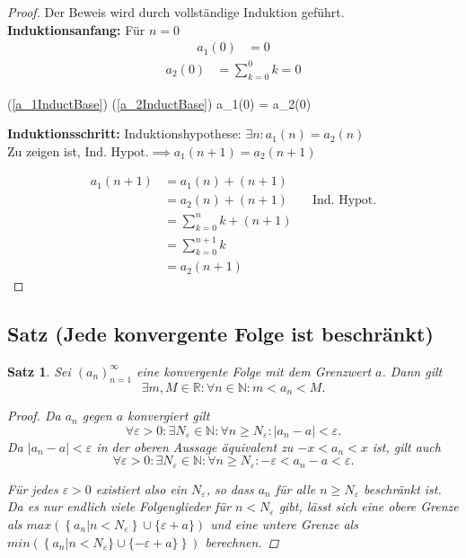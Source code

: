 \documentclass{article}
\newtheorem{thm}{Satz}[section]
\newenvironment{aleq}{
\begin{equation}
\begin{aligned}
}{
\end{aligned}
\end{equation}
}
\newenvironment{aleq*}{\begin{equation*}\begin{aligned}}{\end{aligned}\end{equation*}}
\begin{document}
	\begin{proof} Der Beweis wird durch vollständige Induktion geführt. \\
	\textbf{Induktionsanfang:} Für \(n=0\)
	\begin{aleq}
		\label{a_1InductBase}
			a_1(0) &= 0 
	\end{aleq}
	\begin{aleq}
		\label{a_2InductBase}
			a_2(0) &= \sum_{k=0}^{0} k = 0
	\end{aleq}
	\begin{aleq*}
		(\ref{a_1InductBase}) \land (\ref{a_2InductBase}) \implies a_1(0) = a_2(0)
	\end{aleq*}
	
	
	\textbf{Induktionsschritt:} Induktionshypothese: \(\exists n \colon a_1(n) = a_2(n)\) \\
	Zu zeigen ist, \(\text{Ind. Hypot.} \implies a_1(n+1) = a_2(n+1)\)
	
	\begin{equation*}
		\begin{aligned}
			a_1(n+1) &= a_1(n) + (n+1) \\
			&= a_2(n) + (n+1) && \text{Ind. Hypot.} \\
			&= \sum_{k=0}^{n}k + (n+1) \\
			&= \sum_{k=0}^{n+1}k \\
			&= a_2(n+1)
		\end{aligned}
	\end{equation*}
	\end{proof}
	
	\subsection{Satz (Jede konvergente Folge ist beschränkt)}
	\begin{thm}
		\label{konvergentBeschraenkt}
		Sei \((a_n)_{n=1}^{\infty}\) eine konvergente Folge mit dem Grenzwert \(a\). Dann gilt
		\[
		\exists m,M \in \mathbb{R} \colon \forall n \in \mathbb{N} \colon m < a_n < M \text{.}
		\]
		
		\begin{proof}
			Da \(a_n\) gegen \(a\) konvergiert gilt
		\[
		\forall \varepsilon>0 \colon \exists N_{\varepsilon} \in \mathbb{N} \colon \forall n \geq N_{\varepsilon} \colon |a_n - a| < \varepsilon \text{.}
		\]
		Da \(|a_n - a| < \varepsilon\) in der oberen Aussage äquivalent zu \(-x < a_n < x\) ist, gilt auch
		\[
		\forall \varepsilon>0 \colon \exists N_{\varepsilon} \in \mathbb{N} \colon \forall n \geq N_{\varepsilon} \colon -\varepsilon < a_n - a < \varepsilon \text{.}
		\]
		\par
		Für jedes \(\varepsilon > 0\) existiert also ein \(N_{\varepsilon}\), so dass \(a_n\) für alle \(n \geq N_{\varepsilon}\) beschränkt ist. Da es nur endlich viele Folgenglieder für \(n < N_{\varepsilon}\) gibt, lässt sich eine obere Grenze als \(max (\left\lbrace a_n | n < N_{\varepsilon} \right\rbrace  \cup \lbrace \varepsilon + a \rbrace)\) und eine untere Grenze als \(min (\left\lbrace a_n | n < N_{\varepsilon} \rbrace \cup \lbrace -\varepsilon + a \rbrace\right\rbrace)\) berechnen.
		\end{proof}
	\end{thm}
	
\end{document}
